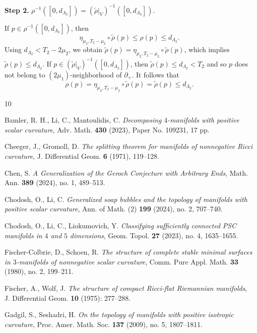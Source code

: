 \documentclass[11pt,letterpaper]{amsart}
\numberwithin{equation}{section}
\theoremstyle{definition}
\newcommand{\ti}[1]{\tilde{#1}}
\begin{document}
\medskip
\noindent
{\bf Step 2.} $\rho^{-1}([0,d_{\Lambda_2}])=(\tilde\rho|_{V})^{-1}([0,d_{\Lambda_2}])$.
\medskip

If $p\in\rho^{-1}([0,d_{\Lambda_2}])$, then
\[
\eta_{\mu_{2},T_{2}-\mu_{2}}\circ\ti{\rho}(p)\leq \rho(p) \leq d_{\Lambda_{2}}.
\]
Using $d_{\Lambda_{2}}<T_{2}-2\mu_{2}$, we obtain $\ti{\rho}(p)=\eta_{\mu_{2},T_{2}-\mu_{2}}\circ\ti{\rho}(p)$, which implies $\ti{\rho}(p)\leq d_{\Lambda_2}$.
If $p\in(\tilde\rho|_{V})^{-1}([0,d_{\Lambda_2}])$, then $\ti{\rho}(p)\leq d_{\Lambda_{2}}<T_{2}$ and so $p$ does not belong to $(2\mu_{1})$-neighborhood of $\partial_{+}$. It follows that
\[
\rho(p)=\eta_{\mu_{2},T_{2}-\mu_{2}}\circ\ti{\rho}(p) = \ti{\rho}(p) \leq d_{\Lambda_{2}}.
\]





\begin{thebibliography}{10}


 Bamler, R. H., Li, C., Mantoulidis, C. {\em Decomposing $4$-manifolds with positive scalar curvature}, {Adv. Math. {\bf 430} (2023), Paper No. 109231, 17 pp.}

 Cheeger, J., Gromoll, D. {\em The splitting theorem for manifolds of nonnegative Ricci curvature}, J. Differential Geom. {\bf 6} (1971), 119--128.

 Chen, S. {\em A Generalization of the Geroch Conjecture with Arbitrary Ends}, {Math. Ann. {\bf 389} (2024), no. 1, 489--513.}

 Chodosh, O., Li, C. {\em Generalized soap bubbles and the topology of manifolds with positive scalar curvature}, {Ann. of Math. (2) {\bf 199} (2024), no. 2, 707--740.}

 Chodosh, O., Li, C., Liokumovich, Y. {\em Classifying sufficiently connected PSC manifolds in $4$ and $5$ dimensions}, Geom. Topol. {\bf 27} (2023), no. 4, 1635--1655.

 Fischer-Colbrie, D., Schoen, R. {\em The structure of complete stable minimal surfaces in $3$-manifolds of nonnegative scalar curvature}, Comm. Pure Appl. Math. {\bf 33} (1980), no. 2, 199--211.

 Fischer, A., Wolf, J. {\em The structure of compact Ricci-flat Riemannian manifolds}, J. Differential Geom. {\bf 10} (1975): 277--288.

 Gadgil, S., Seshadri, H. {\em On the topology of manifolds with positive
isotropic curvature}, Proc. Amer. Math. Soc. {\bf 137} (2009), no. 5, 1807--1811.


\end{thebibliography}
\end{document}
